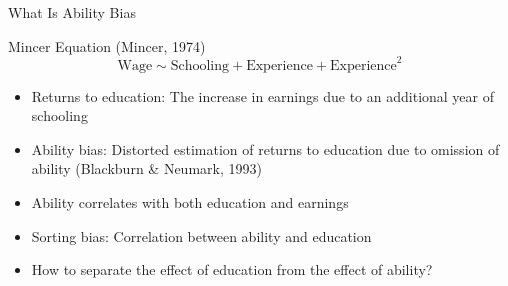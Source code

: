 \documentclass{beamer} %
\begin{document}
\begin{frame}{What Is Ability Bias}

    \begin{block}{Mincer Equation (Mincer, 1974)}
        \large
        \begin{equation*}
            \text{Wage} \sim \text{Schooling} + \text{Experience} + \text{Experience}^2
        \end{equation*}
    \end{block}

    \begin{itemize}
        \item Returns to education: The increase in earnings due to an additional year of schooling
        \item Ability bias: Distorted estimation of returns to education due to omission of ability (Blackburn \& Neumark, 1993)
        \item Ability correlates with both education and earnings
        \item Sorting bias: Correlation between ability and education
        \item How to separate the effect of education from the effect of ability?
    \end{itemize}

\end{frame}
\end{document}
